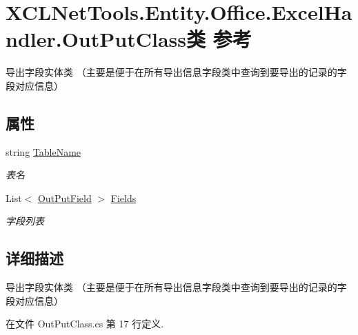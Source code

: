 \hypertarget{class_x_c_l_net_tools_1_1_entity_1_1_office_1_1_excel_handler_1_1_out_put_class}{\section{X\-C\-L\-Net\-Tools.\-Entity.\-Office.\-Excel\-Handler.\-Out\-Put\-Class类 参考}
\label{class_x_c_l_net_tools_1_1_entity_1_1_office_1_1_excel_handler_1_1_out_put_class}
}


导出字段实体类 （主要是便于在所有导出信息字段类中查询到要导出的记录的字段对应信息）  


\subsection*{属性}
\begin{DoxyCompactItemize}
\item 
string \hyperlink{class_x_c_l_net_tools_1_1_entity_1_1_office_1_1_excel_handler_1_1_out_put_class_afdbc40e9ef162503cbf1ebea55728c59}{Table\-Name}
\begin{DoxyCompactList}\small\item\em 表名 \end{DoxyCompactList}\item 
List$<$ \hyperlink{class_x_c_l_net_tools_1_1_entity_1_1_office_1_1_excel_handler_1_1_out_put_field}{Out\-Put\-Field} $>$ \hyperlink{class_x_c_l_net_tools_1_1_entity_1_1_office_1_1_excel_handler_1_1_out_put_class_a3efddb66ca15bab7aa2b15f80d59fa06}{Fields}
\begin{DoxyCompactList}\small\item\em 字段列表 \end{DoxyCompactList}\end{DoxyCompactItemize}


\subsection{详细描述}
导出字段实体类 （主要是便于在所有导出信息字段类中查询到要导出的记录的字段对应信息） 



在文件 Out\-Put\-Class.\-cs 第 17 行定义.



